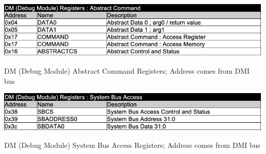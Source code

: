 \begin{table}[H]
    \includegraphics[width=1.00\columnwidth]{./Table/REG_ABSCMD.png}
    \caption{DM (Debug Module) Abstract Command Registers; Address comes from DMI bus}
    \label{tb:REG_ABSCMD}
\end{table}

\begin{table}[H]
    \includegraphics[width=1.00\columnwidth]{./Table/REG_SYSTEMBUS.png}
    \caption{DM (Debug Module) System Bus Access Registers; Address comes from DMI bus}
    \label{tb:REG_SYSTEMBUS}
\end{table}
